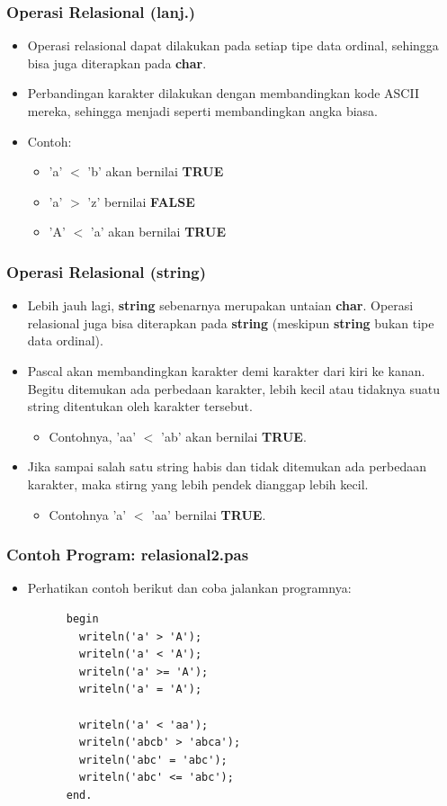 \documentclass{beamer}
\begin{document}
\begin{frame}
\frametitle{Operasi Relasional (lanj.)}
\begin{itemize}
  \item Operasi relasional dapat dilakukan pada setiap tipe data ordinal, sehingga bisa juga diterapkan pada \textbf{char}.
  \item Perbandingan karakter dilakukan dengan membandingkan kode ASCII mereka, sehingga menjadi seperti membandingkan angka biasa.
  \item Contoh:
  \begin{itemize}
    \item 'a' $<$ 'b' akan bernilai \textbf{TRUE}
    \item 'a' $>$ 'z' bernilai \textbf{FALSE}
    \item 'A' $<$ 'a' akan bernilai \textbf{TRUE}
  \end{itemize}
\end{itemize}
\end{frame}

\begin{frame}
\frametitle{Operasi Relasional (string)}
\begin{itemize}
  \item Lebih jauh lagi, \textbf{string} sebenarnya merupakan untaian \textbf{char}. Operasi relasional juga bisa diterapkan pada \textbf{string} (meskipun \textbf{string} bukan tipe data ordinal).
  \item Pascal akan membandingkan karakter demi karakter dari kiri ke kanan. Begitu ditemukan ada perbedaan karakter, lebih kecil atau tidaknya suatu string ditentukan oleh karakter tersebut.
  \begin{itemize}
    \item Contohnya, 'aa' $<$ 'ab' akan bernilai \textbf{TRUE}.
  \end{itemize}
  \item Jika sampai salah satu string habis dan tidak ditemukan ada perbedaan karakter, maka stirng yang lebih pendek dianggap lebih kecil.
  \begin{itemize}
    \item Contohnya 'a' $<$ 'aa' bernilai \textbf{TRUE}.
  \end{itemize}
\end{itemize}
\end{frame}

\begin{frame}[fragile]
\frametitle{Contoh Program: relasional2.pas}
\begin{itemize}
  \item Perhatikan contoh berikut dan coba jalankan programnya:
    \begin{lstlisting}
      begin
        writeln('a' > 'A');
        writeln('a' < 'A');
        writeln('a' >= 'A');
        writeln('a' = 'A');

        writeln('a' < 'aa');
        writeln('abcb' > 'abca');
        writeln('abc' = 'abc');
        writeln('abc' <= 'abc');
      end.
    \end{lstlisting}
\end{itemize}
\end{frame}
\end{document}
